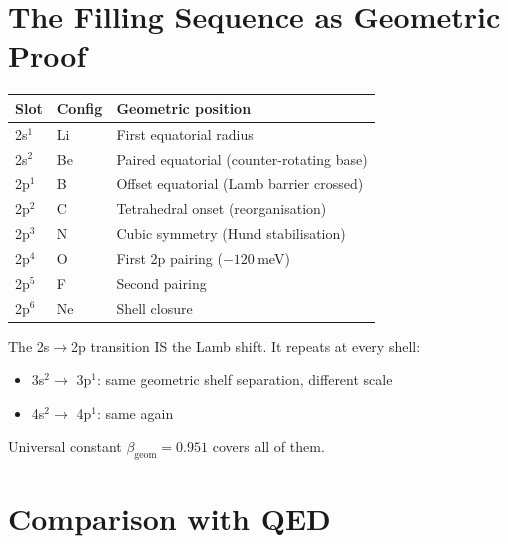 \section{The Filling Sequence as Geometric Proof}

\begin{center}
\begin{tabular}{lll}
\hline
Slot & Config & Geometric position \\
\hline
2s$^1$ & Li & First equatorial radius \\
2s$^2$ & Be & Paired equatorial (counter-rotating base) \\
\hline
2p$^1$ & B & Offset equatorial (Lamb barrier crossed) \\
2p$^2$ & C & Tetrahedral onset (reorganisation) \\
2p$^3$ & N & Cubic symmetry (Hund stabilisation) \\
2p$^4$ & O & First 2p pairing ($-120$\,meV) \\
2p$^5$ & F & Second pairing \\
2p$^6$ & Ne & Shell closure \\
\hline
\end{tabular}
\end{center}

The 2s$\to$2p transition IS the Lamb shift.  It repeats at every shell:
\begin{itemize}
  \item 3s$^2 \to$ 3p$^1$: same geometric shelf separation, different scale
  \item 4s$^2 \to$ 4p$^1$: same again
\end{itemize}

Universal constant $\beta_{\text{geom}} = 0.951$ covers all of them.


\section{Comparison with QED}


